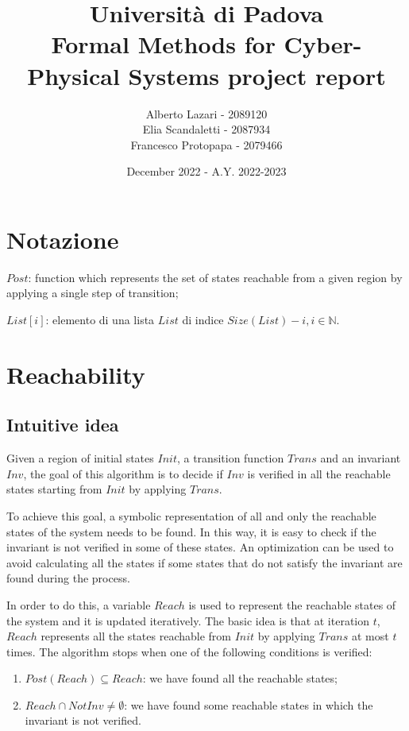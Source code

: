 \documentclass[12pt]{article}
\title{\textbf{Università di Padova \\ Formal Methods for Cyber-Physical Systems project report}}
\author{Alberto Lazari - 2089120 \\ Elia Scandaletti - 2087934 \\ Francesco Protopapa - 2079466 \\}
\date{December 2022 - A.Y. 2022-2023}
\begin{document}
    \maketitle
    \pagebreak

    \tableofcontents
    \pagebreak

    \section{Notazione}
    \begin{description}
        \item $Post$: function which represents the set of states reachable from a given region by applying a single step of transition;
        \item $List[i]$: elemento di una lista $List$ di indice $Size(List) - i, i \in \mathbb N$.
    \end{description}

    \section{Reachability}
    \subsection{Intuitive idea}
    Given a region of initial states $Init$, a transition function $Trans$ and an invariant $Inv$, the goal of this algorithm is to decide if $Inv$ is verified in all the reachable states starting from $Init$ by applying $Trans$.

    To achieve this goal, a symbolic representation of all and only the reachable states of the system needs to be found. In this way, it is easy to check if the invariant is not verified in some of these states. An optimization can be used to avoid calculating all the states if some states that do not satisfy the invariant are found during the process.

    In order to do this, a variable $Reach$ is used to represent the reachable states of the system and it is updated iteratively.
    The basic idea is that at iteration $t$, $Reach$ represents all the states reachable from $Init$ by applying $Trans$ at most $t$ times.
    The algorithm stops when one of the following conditions is verified:
    \begin{enumerate}
        \item $Post(Reach) \subseteq Reach $: we have found all the reachable states;
        \item $Reach \cap NotInv \neq \emptyset$: we have found some reachable states in which the invariant is not verified.
    \end{enumerate}
\end{document}
